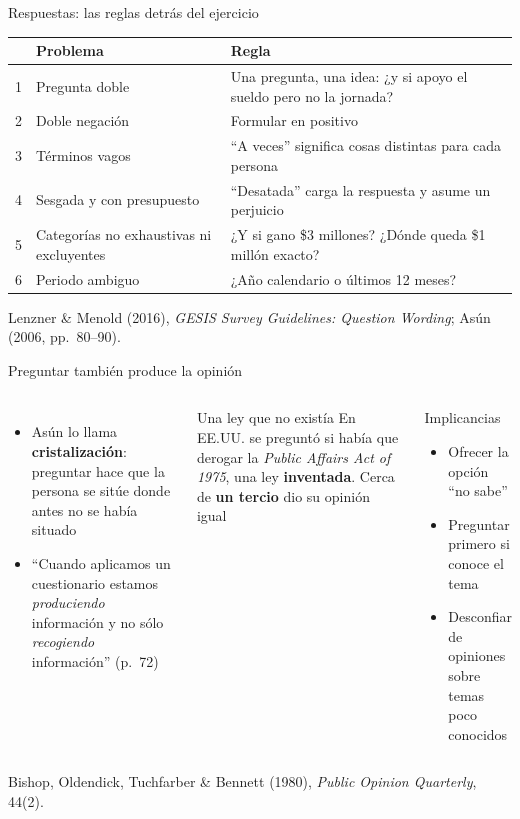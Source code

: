 \documentclass[aspectratio=169,11pt]{beamer}
\newcommand{\hl}[1]{\textcolor{marino}{\textbf{#1}}}        %
\newcommand{\fuente}[1]{\par\vfill{\scriptsize\color{gris}#1\par}}
\renewcommand{\arraystretch}{1.5}
\begin{document}
\begin{frame}{Respuestas: las reglas detrás del ejercicio}
\begin{center}
\small
\renewcommand{\arraystretch}{1.4}
\begin{tabular}{c>{\raggedright}p{}p{}}
\toprule
& \textbf{Problema} & \textbf{Regla} \\
\midrule
\rowcolor{crema}
1 & Pregunta doble & Una pregunta, una idea: ¿y si apoyo el sueldo pero no la jornada? \\
2 & Doble negación & Formular en positivo \\
\rowcolor{crema}
3 & Términos vagos & ``A veces'' significa cosas distintas para cada persona \\
4 & Sesgada y con presupuesto & ``Desatada'' carga la respuesta y asume un perjuicio \\
\rowcolor{crema}
5 & Categorías no exhaustivas ni excluyentes & ¿Y si gano \$3 millones? ¿Dónde queda \$1 millón exacto? \\
6 & Periodo ambiguo & ¿Año calendario o últimos 12 meses? \\
\bottomrule
\end{tabular}
\end{center}
\fuente{Lenzner \& Menold (2016), \emph{GESIS Survey Guidelines: Question Wording}; Asún (2006, pp.~80--90).}
\end{frame}

\begin{frame}{Preguntar también produce la opinión}
\begin{columns}[T]
\begin{itemize}
  \item Asún lo llama \hl{cristalización}: preguntar hace que la persona se sitúe donde antes no se había situado
  \item ``Cuando aplicamos un cuestionario estamos \emph{produciendo} información y no sólo \emph{recogiendo} información'' (p.~72)
\end{itemize}
\bigskip
\begin{exampleblock}{Una ley que no existía}
\small
En EE.UU. se preguntó si había que derogar la \textit{Public Affairs Act of 1975}, una ley \textbf{inventada}. Cerca de \textbf{un tercio} dio su opinión igual
\end{exampleblock}
\begin{block}{Implicancias}
\small
\begin{itemize}
  \item Ofrecer la opción ``no sabe''
  \item Preguntar primero si conoce el tema
  \item Desconfiar de opiniones sobre temas poco conocidos
\end{itemize}
\end{block}
\end{columns}
\fuente{Bishop, Oldendick, Tuchfarber \& Bennett (1980), \emph{Public Opinion Quarterly}, 44(2).}
\end{frame}
\end{document}
